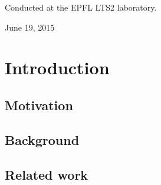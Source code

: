 \documentclass[a4paper,12pt,twoside]{report}
\begin{document}
\begin{titlepage}
\begin{center}
	\end{center}
	
	\vspace{1.3cm}
	{\large Conducted at the EPFL LTS2 laboratory.}
	\vspace{1.3cm}

	\begin{center}
		{\large June 19, 2015}
	\end{center}
	
\end{titlepage}
\hypersetup{pageanchor=true}

\begin{abstract}
	abstract
\end{abstract}

\renewcommand{\abstractname}{Acknowledgements}
\begin{abstract}
	Xavier for day-to-day supervision. Many inputs and intuitions. Discussion of the results.
	
	Johan for intuitions at the start of the project, advices and proof reading of the thesis.
	
	Pierre
	
\end{abstract}

\tableofcontents

\printglossaries
{}

\chapter*{Introduction}

\section*{Motivation}

\section*{Background}
\label{background}

\section*{Related work}
\end{document}
